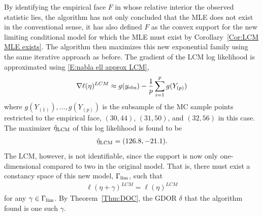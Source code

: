 By identifying the empirical face $F$ in whose relative interior the observed 
statistic lies, 
the algorithm has not only concluded that the MLE does not exist in the conventional 
sense, it has also defined $F$ as the convex support for the new limiting conditional 
model for which the MLE must exist by Corollary~\ref{Cor:LCM MLE exists}.
The algorithm then maximizes this new exponential family using the same 
iterative approach as before.  The gradient of the LCM log likelihood is approximated 
using \eqref{E:nabla ell approx LCM},
\begin{align*}
	\nabla \ell( \eta )^{LCM} \approx g(y_{\text{obs}}) - \frac{1}{p} \sum_{i=1}^p g(Y_{(p)})
\end{align*}
where $g(Y_{(1)}), \ldots, g(Y_{(p)})$ is the subsample of the MC sample points 
restricted to the empirical face, $(30,44)$, $(31,50)$, and $(32,56)$ in this case.  
The maximizer $\hat{\eta}_{\textrm{LCM}}$ of this log likelihood is found to
be
\begin{align*}
\hat{\eta}_{\textrm{LCM}} = (126.8, -21.1).
\end{align*}
The LCM, however, is not identifiable, since the support is now only one-dimensional 
compared to two in the original model.  That is, there must exist a constancy space 
of this new model, $\Gamma_{\textrm{lim}}$, such that 
\begin{align} \label{E:Gammalim}
\ell( \eta + \gamma )^{LCM} = \ell( \eta )^{LCM}
\end{align}
for any $\gamma \in \Gamma_{\textrm{lim}}$.  By Theorem~\ref{Thm:DOC}, the GDOR $\delta$ 
that the algorithm found is one such $\gamma$.

